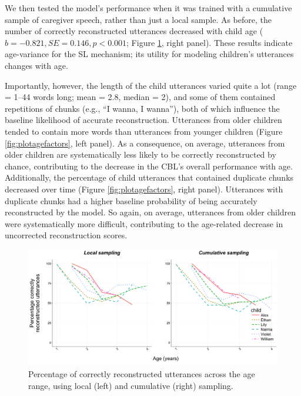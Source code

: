 \documentclass{article}
\begin{document}
We then tested the model's performance when it was trained with a cumulative sample of caregiver speech, rather than just a local sample. As before, the number of correctly reconstructed utterances decreased with child age ($b=-0.821, SE = 0.146, p < 0.001$; Figure \ref{fig:plotbothreconperc}, right panel). These results indicate age-variance for the SL mechanism; its utility for modeling children's utterances changes with age.

Importantly, however, the length of the child utterances varied quite a lot (range = 1--44 words long; mean = 2.8, median = 2), and some of them contained repetitions of chunks (e.g., ``I wanna, I wanna''), both of which influence the baseline likelihood of accurate reconstruction. Utterances from older children tended to contain more words than utterances from younger children (Figure \ref{fig:plotagefactors}, left panel). As a consequence, on average, utterances from older children are systematically less likely to be correctly reconstructed by chance, contributing to the decrease in the CBL's overall performance with age. Additionally, the percentage of child utterances that contained duplicate chunks decreased over time (Figure \ref{fig:plotagefactors}, right panel). Utterances with duplicate chunks had a higher baseline probability of being accurately reconstructed by the model. So again, on average, utterances from older children were systematically more difficult, contributing to the age-related decrease in uncorrected reconstruction scores.

\begin{figure}
\centering
\includegraphics[width=\textwidth]{images/plotbothreconstruction_perc.png} 
\caption{Percentage of correctly reconstructed utterances across the age range, using local (left) and cumulative (right) sampling.}
\label{fig:plotbothreconperc}
\end{figure}
\end{document}
